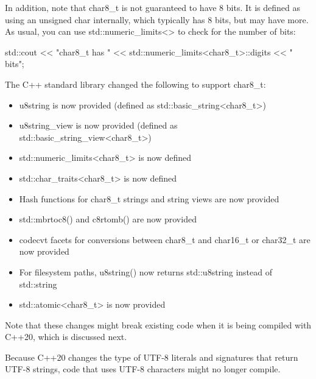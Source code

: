 In addition, note that char8\_t is not guaranteed to have 8 bits. It is defined as using an unsigned char internally, which typically has 8 bits, but may have more. As usual, you can use std::numeric\_limits<> to check for the number of bits:

\begin{cpp}
std::cout << "char8_t has "
		  << std::numeric_limits<char8_t>::digits << " bits\n";
\end{cpp}



The C++ standard library changed the following to support char8\_t:

\begin{itemize}
\item 
u8string is now provided (defined as std::basic\_string<char8\_t>)

\item 
u8string\_view is now provided (defined as std::basic\_string\_view<char8\_t>)

\item 
std::numeric\_limits<char8\_t> is now defined

\item 
std::char\_traits<char8\_t> is now defined

\item 
Hash functions for char8\_t strings and string views are now provided

\item 
std::mbrtoc8() and c8rtomb() are now provided

\item 
codecvt facets for conversions between char8\_t and char16\_t or char32\_t are now provided

\item 
For filesystem paths, u8string() now returns std::u8string instead of std::string

\item 
std::atomic<char8\_t> is now provided

\end{itemize}

Note that these changes might break existing code when it is being compiled with C++20, which is discussed next.


Because C++20 changes the type of UTF-8 literals and signatures that return UTF-8 strings, code that uses UTF-8 characters might no longer compile.

